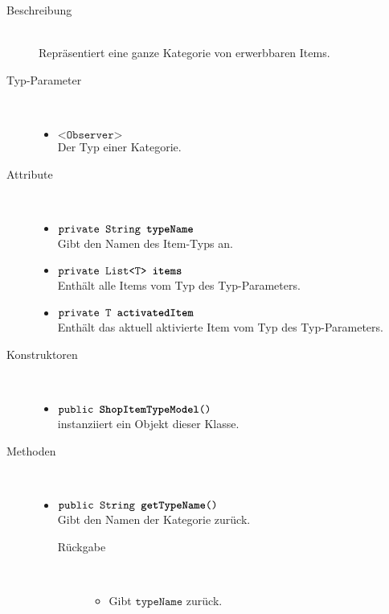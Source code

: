\begin{description}
\item[Beschreibung] \hfill \\ Repräsentiert eine ganze Kategorie von erwerbbaren Items.

\item[Typ-Parameter] \hfill \\
	\vspace{-.8cm}
	\begin{itemize}
		\item $\texttt{<Observer>}$ \\ Der Typ einer Kategorie.
	\end{itemize}

\item[Attribute] \hfill \\
	\vspace{-.8cm}
	\begin{itemize}
		\item $\texttt{private String \textbf{typeName}}$ \\ Gibt den Namen des Item-Typs an.
		\item $\texttt{private List<T> \textbf{items}}$ \\ Enthält alle Items vom Typ des Typ-Parameters.
		\item $\texttt{private T \textbf{activatedItem}}$ \\ Enthält das aktuell aktivierte Item vom Typ des Typ-Parameters.
		\end{itemize}
	
\item[Konstruktoren] \hfill \\
	\vspace{-.8cm}
	\begin{itemize}
		\item $\texttt{public \textbf{ShopItemTypeModel}()}$ \\ instanziiert ein Objekt dieser Klasse.

	\end{itemize}
	
\item[Methoden] \hfill \\
	\vspace{-.8cm}
	\begin{itemize}
		\item $\texttt{public String \textbf{getTypeName}()}$ \\ Gibt den Namen der Kategorie zurück.
		\begin{description}
			\item[Rückgabe] \hfill \\
			\vspace{-.8cm}
			\begin{itemize}
				\item Gibt $\texttt{typeName}$ zurück.
			\end{itemize}
			\end{description}
		

\end{itemize}
\end{description}
